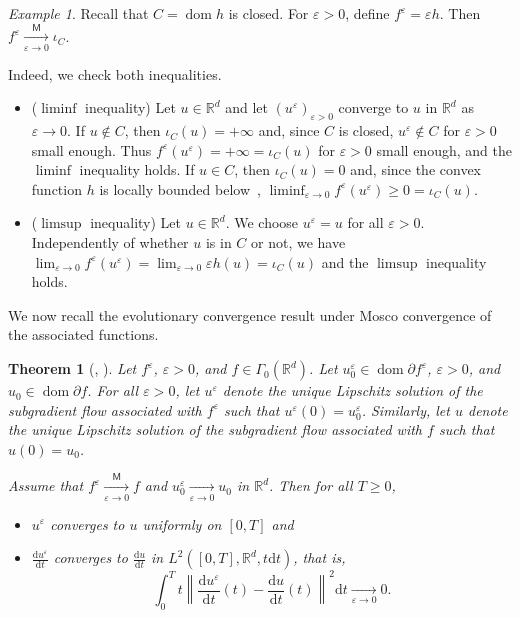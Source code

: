 \documentclass[11pt,english,reqno]{article}
\DeclareMathOperator{\dom}{dom}
\newcommand{\diff}{\mathrm{d}}
\newcommand{\R}{\mathbb{R}}
\renewcommand{\geq}{\geqslant}
\theoremstyle{plain}
\newtheorem{thm}[proposition]{Theorem}
\theoremstyle{definition}
\theoremstyle{remark}
\newtheorem{example}[proposition]{Example}
\numberwithin{equation}{section}
\begin{document}
\begin{example}
	\label{ex:mosco}
	Recall that $C = \dom h$ is closed. For $\varepsilon > 0$, define $f^{\varepsilon} = {\varepsilon} h$. Then $f^{\varepsilon} \xrightarrow[\varepsilon \to 0]{\mathsf{M}} \iota_C$.

	Indeed, we check both inequalities.

	\begin{itemize}
		\item ($\liminf$ inequality) Let $u \in \R^d$ and let $(u^{\varepsilon})_{\varepsilon > 0}$ converge to $u$ in $\R^d$ as $\varepsilon \to 0$. If $u \notin C$, then $\iota_C(u) = +\infty$ and, since $C$ is closed, $u^\varepsilon \notin C$ for $\varepsilon > 0$ small enough. Thus $f^{\varepsilon}(u^\varepsilon) = +\infty = \iota_C(u)$ for $\varepsilon > 0$ small enough, and the $\liminf$ inequality holds. If $u \in C$, then $\iota_C(u) = 0$ and, since the convex function $h$ is locally bounded below~\cite[Coro.~16.18]{bauschke2017convex}, $\liminf_{\varepsilon \to 0} f^{\varepsilon}(u^\varepsilon) \geq 0 = \iota_C(u)$.
		\item ($\limsup$ inequality) Let $u \in \R^d$. We choose $u^\varepsilon = u$ for all $\varepsilon > 0$. Independently of whether $u$ is in $C$ or not, we have $\lim_{\varepsilon \to 0} f^{\varepsilon}(u^\varepsilon) = \lim_{\varepsilon \to 0} \varepsilon h(u) = \iota_C(u)$ and the $\limsup$ inequality holds. 
	\end{itemize}
\end{example}

We now recall the evolutionary convergence result under Mosco convergence of the associated functions.

\begin{thm}[{\cite{attouch1977convergence}, \cite[Thm.~3.74]{attouch1984variational}}]
	\label{thm:gamma_convergence}
	Let $f^{\varepsilon}$, $\varepsilon > 0$, and $f \in \Gamma_0(\R^d)$. Let $u^{\varepsilon}_0 \in {\dom \partial f^{\varepsilon}}$, $\varepsilon > 0$, and $u_0 \in {\dom \partial f}$. For all $\varepsilon > 0$, let $u^{\varepsilon}$ denote the unique Lipschitz solution of the subgradient flow associated with $f^{\varepsilon}$ such that $u^\varepsilon(0) = u_0^{\varepsilon}$. Similarly, let $u$ denote the unique Lipschitz solution of the subgradient flow associated with $f$ such that $u(0) = u_0$.

	Assume that $\displaystyle f^{\varepsilon} \xrightarrow[\varepsilon \to 0]{\mathsf{M}} f$ and  $u^{\varepsilon}_0 \xrightarrow[\varepsilon\to 0]{} u_0$ in $\R^d$. Then for all $T \geq 0$,  
	\begin{itemize}
		\item $u^{\varepsilon}$ converges to $u$ uniformly on $[0,T]$ and
		\item $\displaystyle \frac{\diff u^{\varepsilon}}{\diff t}$ converges to $\displaystyle \frac{\diff u}{\diff t}$ in $L^2([0,T], \R^d, t \diff t)$, that is,
		\[
			\int_0^T t \left\| \frac{\diff u^{\varepsilon}}{\diff t}(t) - \frac{\diff u}{\diff t}(t) \right\|^2 \diff t \xrightarrow[\varepsilon \to 0]{} 0.
		\]
	\end{itemize} 
\end{thm}
\end{document}
